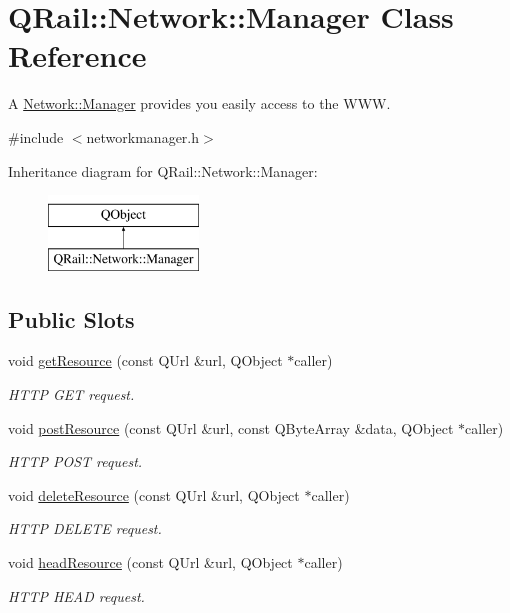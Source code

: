 \hypertarget{classQRail_1_1Network_1_1Manager}{}\section{Q\+Rail\+::Network\+::Manager Class Reference}
\label{classQRail_1_1Network_1_1Manager}


A \mbox{\hyperlink{classQRail_1_1Network_1_1Manager}{Network\+::\+Manager}} provides you easily access to the W\+WW.  




{\ttfamily \#include $<$networkmanager.\+h$>$}

Inheritance diagram for Q\+Rail\+::Network\+::Manager\+:\begin{figure}[H]
\begin{center}
\leavevmode
\includegraphics[height=2.000000cm]{classQRail_1_1Network_1_1Manager}
\end{center}
\end{figure}
\subsection*{Public Slots}
\begin{DoxyCompactItemize}
\item 
void \mbox{\hyperlink{classQRail_1_1Network_1_1Manager_af6dfa87af8f58dc2506ef97247c95037}{get\+Resource}} (const Q\+Url \&url, Q\+Object $\ast$caller)
\begin{DoxyCompactList}\small\item\em H\+T\+TP G\+ET request. \end{DoxyCompactList}\item 
void \mbox{\hyperlink{classQRail_1_1Network_1_1Manager_a7f479ad3bcff90ffba6fab969294c338}{post\+Resource}} (const Q\+Url \&url, const Q\+Byte\+Array \&data, Q\+Object $\ast$caller)
\begin{DoxyCompactList}\small\item\em H\+T\+TP P\+O\+ST request. \end{DoxyCompactList}\item 
void \mbox{\hyperlink{classQRail_1_1Network_1_1Manager_a67ba7523afcb7f97842bb6626a81166d}{delete\+Resource}} (const Q\+Url \&url, Q\+Object $\ast$caller)
\begin{DoxyCompactList}\small\item\em H\+T\+TP D\+E\+L\+E\+TE request. \end{DoxyCompactList}\item 
void \mbox{\hyperlink{classQRail_1_1Network_1_1Manager_adde10f409e9b77b59b145fd2609244a7}{head\+Resource}} (const Q\+Url \&url, Q\+Object $\ast$caller)
\begin{DoxyCompactList}\small\item\em H\+T\+TP H\+E\+AD request. \end{DoxyCompactList}\end{DoxyCompactItemize}

